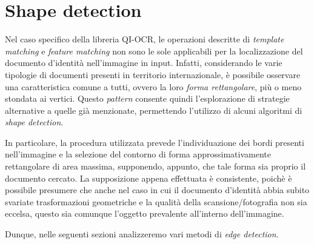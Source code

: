 \section{Shape detection}
\label{sec:shape-detection}
Nel caso specifico della libreria QI-OCR, le operazioni descritte di \textit{template matching} e \textit{feature matching} non sono le sole applicabili per la localizzazione del documento d'identit\`a nell'immagine in input. Infatti, considerando le varie tipologie di documenti presenti in territorio internazionale, \`e possibile osservare una caratteristica comune a tutti, ovvero la loro \textit{forma rettangolare}, pi\`u o meno stondata ai vertici. Questo \textit{pattern} consente quindi l'esplorazione di strategie alternative a quelle gi\`a menzionate, permettendo l'utilizzo di alcuni algoritmi di \textit{shape detection}.\par
In particolare, la procedura utilizzata prevede l'individuazione dei bordi presenti nell'immagine e la selezione del contorno di forma approssimativamente rettangolare di area massima, supponendo, appunto, che tale forma sia proprio il documento cercato. La supposizione appena effettuata \`e consistente, poich\`e \`e possibile presumere che anche nel caso in cui il documento d'identit\`a abbia subito svariate trasformazioni geometriche e la qualit\`a della scansione/fotografia non sia eccelsa, questo sia comunque l'oggetto prevalente all'interno dell'immagine.\par
Dunque, nelle seguenti sezioni analizzeremo vari metodi di \textit{edge detection}.

